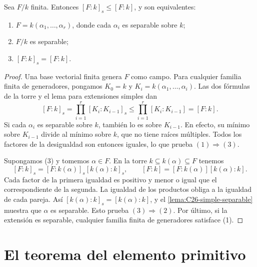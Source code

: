 \begin{prop}\label{prop:C26-separable-generadores}
Sea $F/k$ finita. Entonces $[F:k]_s\leq[F:k]$, y son equivalentes:
\begin{enumerate}[nosep]
\item $F=k(\alpha_1,\ldots,\alpha_r)$, donde cada $\alpha_i$ es separable sobre $k$;
\item $F/k$ es separable;
\item $[F:k]_s=[F:k]$.
\end{enumerate}
\end{prop}
\begin{proof}
Una base vectorial finita genera $F$ como campo. Para cualquier familia finita de generadores, pongamos $K_0=k$ y $K_i=k(\alpha_1,\ldots,\alpha_i)$. Las dos fórmulas de la torre y el lema para extensiones simples dan
\[
[F:k]_s=\prod_{i=1}^r[K_i:K_{i-1}]_s
\leq\prod_{i=1}^r[K_i:K_{i-1}]=[F:k].
\]
Si cada $\alpha_i$ es separable sobre $k$, también lo es sobre $K_{i-1}$. En efecto, su mínimo sobre $K_{i-1}$ divide al mínimo sobre $k$, que no tiene raíces múltiples. Todos los factores de la desigualdad son entonces iguales, lo que prueba $(1)\Rightarrow(3)$.

Supongamos (3) y tomemos $\alpha\in F$. En la torre $k\subseteq k(\alpha)\subseteq F$ tenemos
\[
[F:k]_s=[F:k(\alpha)]_s[k(\alpha):k]_s,
\qquad
[F:k]=[F:k(\alpha)][k(\alpha):k].
\]
Cada factor de la primera igualdad es positivo y menor o igual que el correspondiente de la segunda. La igualdad de los productos obliga a la igualdad de cada pareja. Así $[k(\alpha):k]_s=[k(\alpha):k]$, y el \cref{lema:C26-simple-separable} muestra que $\alpha$ es separable. Esto prueba $(3)\Rightarrow(2)$. Por último, si la extensión es separable, cualquier familia finita de generadores satisface (1).
\end{proof}

\section{El teorema del elemento primitivo}
